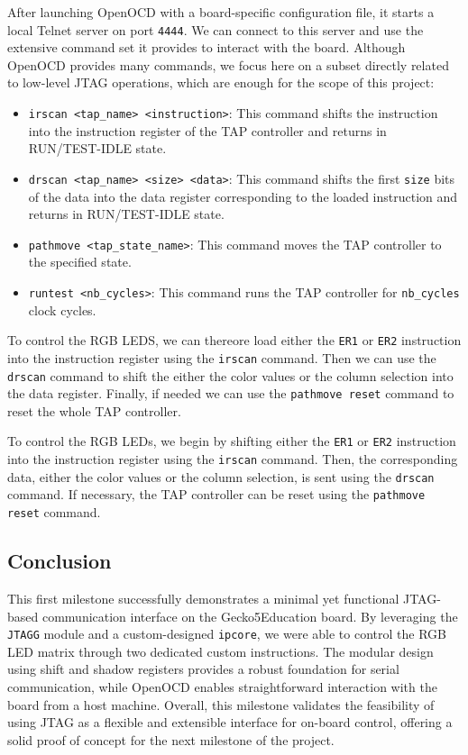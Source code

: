 \documentclass[a4paper,11pt,oneside]{report}
\newcommand{\boardName}{Gecko5Education \xspace}
\begin{document}
After launching OpenOCD with a board-specific configuration file, it starts a local Telnet server on port \texttt{4444}.  
We can connect to this server and use the extensive command set it provides to interact with the board.  
Although OpenOCD provides many commands, we focus here on a subset directly related to low-level JTAG operations, which are enough for the scope of this project:

\begin{itemize}
    \item \verb|irscan <tap_name> <instruction>|: This command shifts the instruction into the instruction register of the TAP controller and returns in RUN/TEST-IDLE state.
    \item \verb|drscan <tap_name> <size> <data>|: This command shifts the first \texttt{size} bits of the data into the data register corresponding to the loaded instruction and returns in RUN/TEST-IDLE state.
    \item \verb|pathmove <tap_state_name>|: This command moves the TAP controller to the specified state.
    \item \verb|runtest <nb_cycles>|: This command runs the TAP controller for \texttt{nb\_cycles} clock cycles.
\end{itemize}

To control the RGB LEDS, we can thereore load either the \texttt{ER1} or \texttt{ER2} instruction into the instruction register using the \texttt{irscan} command.
Then we can use the \texttt{drscan} command to shift the either the color values or the column selection into the data register.
Finally, if needed we can use the \texttt{pathmove reset} command to reset the whole TAP controller.

To control the RGB LEDs, we begin by shifting either the \texttt{ER1} or \texttt{ER2} instruction into the instruction register using the \texttt{irscan} command.  
Then, the corresponding data, either the color values or the column selection, is sent using the \texttt{drscan} command.  
If necessary, the TAP controller can be reset using the \texttt{pathmove reset} command.

\subsection{Conclusion}

This first milestone successfully demonstrates a minimal yet functional JTAG-based communication interface on the \boardName board.  
By leveraging the \texttt{JTAGG} module and a custom-designed \texttt{ipcore}, we were able to control the RGB LED matrix through two dedicated custom instructions.  
The modular design using shift and shadow registers provides a robust foundation for serial communication, while OpenOCD enables straightforward interaction with the board from a host machine.  
Overall, this milestone validates the feasibility of using JTAG as a flexible and extensible interface for on-board control, offering a solid proof of concept for the next milestone of the project.
\end{document}
